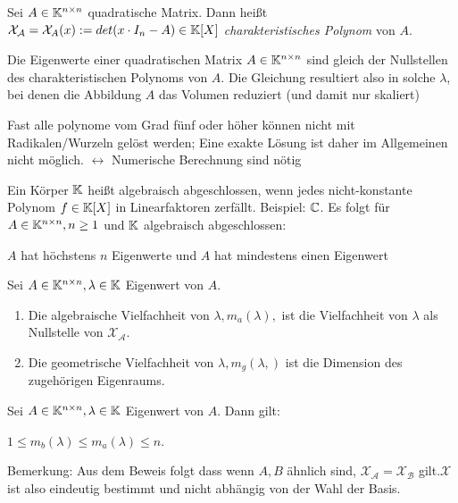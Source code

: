 \begin{satz}
	Sei $A \in \mathbb{K}^{n \times n}$ quadratische Matrix. Dann heißt $\mathcal{X_A} = \mathcal{X}_A(x) := det(x \cdot I_n -A) \in \mathbb{K}[X]$ \emph{charakteristisches Polynom} von $A$.

	Die Eigenwerte einer quadratischen Matrix $A \in \mathbb{K}^{n \times n}$ sind gleich der Nullstellen des charakteristischen Polynoms von $A$. Die Gleichung resultiert also in solche $\lambda$, bei denen die Abbildung $A$ das Volumen reduziert (und damit nur skaliert)
\end{satz}

\begin{satz}
	Fast alle polynome vom Grad fünf oder höher können nicht mit Radikalen/Wurzeln gelöst werden; Eine exakte Lösung ist daher im Allgemeinen nicht möglich. 
	$\leftrightarrow$ Numerische Berechnung sind nötig
\end{satz}

\begin{definition}
	Ein Körper $\mathbb{K}$ heißt algebraisch abgeschlossen, wenn jedes nicht-konstante Polynom $f \in \mathbb{K}[X]$ in Linearfaktoren zerfällt. Beispiel: $\mathbb{C}$. Es folgt für $A \in \mathbb{K}^{n \times n}, n \geq 1$ und $\mathbb{K}$ algebraisch abgeschlossen:
	\begin{description}[noitemsep]
		\item $A$ hat höchstens $n$ Eigenwerte und $A$ hat mindestens einen Eigenwert
	\end{description}
\end{definition}

\begin{definition}
	Sei $A \in \mathbb{K}^{n \times n}, \lambda \in \mathbb{K}$ Eigenwert von $A$.
	\begin{enumerate}[noitemsep]
		\item Die algebraische Vielfachheit von $\lambda, m_a(\lambda),$ ist die Vielfachheit von $\lambda$ als Nullstelle von $\mathcal{X_A}$.
		\item Die geometrische Vielfachheit von $\lambda, m_g(\lambda,)$ ist die Dimension des zugehörigen Eigenraums.
	\end{enumerate}
\end{definition}

\begin{satz}
	Sei $A \in \mathbb{K}^{n \times n}, \lambda \in \mathbb{K}$ Eigenwert von $A$. Dann gilt:
	
	$1 \leq m_b(\lambda) \leq m_a(\lambda) \leq n$.
	
	Bemerkung: Aus dem Beweis folgt dass wenn $A, B$ ähnlich sind, $\mathcal{X_A} = \mathcal{X_B}$ gilt.$\mathcal{X}$
 ist also eindeutig bestimmt und nicht abhängig von der Wahl der Basis. \end{satz}

